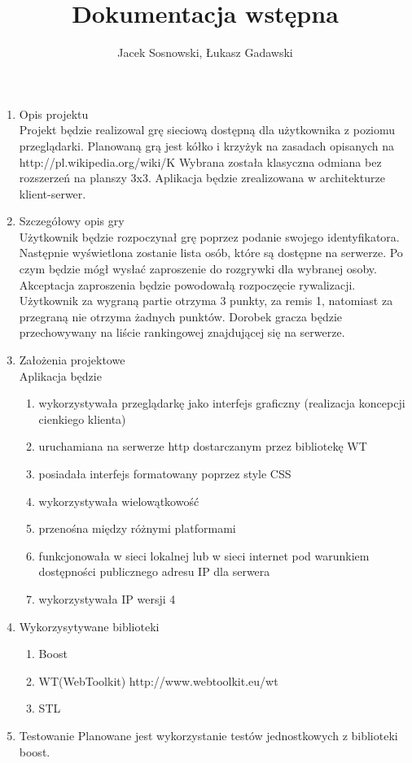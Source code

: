 \documentclass[10pt,a4paper]{report}
\author{Jacek Sosnowski, Łukasz Gadawski}
\title{Dokumentacja wstępna}
\begin{document}
\maketitle

\begin{enumerate}
\item Opis projektu \\
Projekt będzie realizowal grę sieciową dostępną dla użytkownika z poziomu przeglądarki.
Planowaną grą jest kółko i krzyżyk na zasadach opisanych na http://pl.wikipedia.org/wiki/K%
Wybrana została klasyczna odmiana bez rozszerzeń na planszy 3x3. Aplikacja będzie zrealizowana w architekturze klient-serwer.

\item Szczegółowy opis gry \\
Użytkownik będzie rozpoczynał grę poprzez podanie swojego identyfikatora. Następnie wyświetlona zostanie lista osób, 
które są dostępne na serwerze. Po czym będzie mógł wysłać zaproszenie do rozgrywki dla wybranej osoby. Akceptacja
zaproszenia będzie powodowałą rozpoczęcie rywalizacji. \\
Użytkownik za wygraną partie otrzyma 3 punkty, za remis 1, natomiast za przegraną nie otrzyma żadnych punktów. 
Dorobek gracza będzie przechowywany na liście rankingowej znajdującej się na serwerze. 

\item Założenia projektowe	\\
Aplikacja będzie 
\begin{enumerate}
\item wykorzystywała przeglądarkę jako interfejs graficzny (realizacja koncepcji cienkiego klienta)
\item uruchamiana na serwerze http dostarczanym przez bibliotekę WT
\item posiadała interfejs formatowany poprzez style CSS
\item wykorzystywała wielowątkowość
\item przenośna między różnymi platformami
\item funkcjonowała w sieci lokalnej lub w sieci internet pod warunkiem dostępności publicznego adresu IP dla serwera
\item wykorzystywała IP wersji 4
\end{enumerate}

\item Wykorzysytywane biblioteki
\begin{enumerate}
\item Boost 
\item WT(WebToolkit) http://www.webtoolkit.eu/wt
\item STL
\end{enumerate}

\item Testowanie
Planowane jest wykorzystanie testów jednostkowych z biblioteki boost. 
\end{enumerate}
\end{document}
